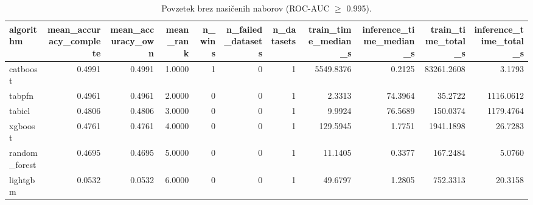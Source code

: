 \begin{table}[htbp]
\centering
\caption{Povzetek brez nasičenih naborov (ROC-AUC $\geq$ 0.995).}
\label{tab:overall-nonsat}
\begin{tabular}{lrrrrrrrrrr}
\hline
algorithm & mean\_accuracy\_complete & mean\_accuracy\_own & mean\_rank & n\_wins & n\_failed\_datasets & n\_datasets & train\_time\_median\_s & inference\_time\_median\_s & train\_time\_total\_s & inference\_time\_total\_s \\
\hline
catboost & 0.4991 & 0.4991 & 1.0000 & 1 & 0 & 1 & 5549.8376 & 0.2125 & 83261.2608 & 3.1793 \\
tabpfn & 0.4961 & 0.4961 & 2.0000 & 0 & 0 & 1 & 2.3313 & 74.3964 & 35.2722 & 1116.0612 \\
tabicl & 0.4806 & 0.4806 & 3.0000 & 0 & 0 & 1 & 9.9924 & 76.5689 & 150.0374 & 1179.4764 \\
xgboost & 0.4761 & 0.4761 & 4.0000 & 0 & 0 & 1 & 129.5945 & 1.7751 & 1941.1898 & 26.7283 \\
random\_forest & 0.4695 & 0.4695 & 5.0000 & 0 & 0 & 1 & 11.1405 & 0.3377 & 167.2484 & 5.0760 \\
lightgbm & 0.0532 & 0.0532 & 6.0000 & 0 & 0 & 1 & 49.6797 & 1.2805 & 752.3313 & 20.3158 \\
\hline
\end{tabular}
\end{table}
